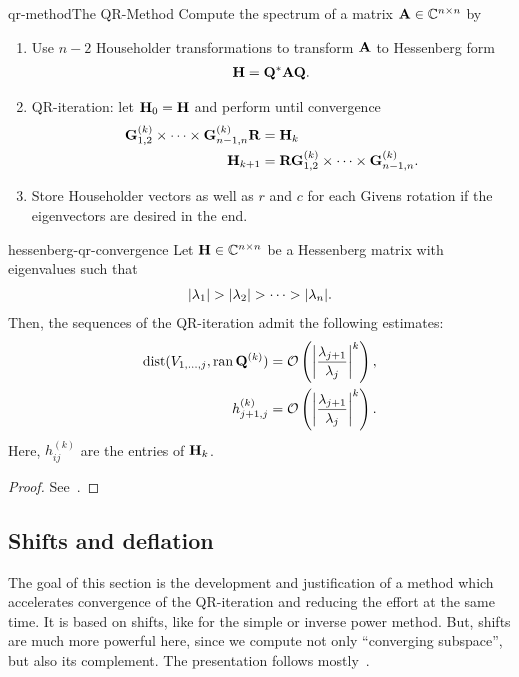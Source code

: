 \begin{Algorithm*}{qr-method}{The QR-Method}
  Compute the spectrum of a matrix $\mata\in\Cnn$ by
  \begin{enumerate}
  \item Use $n-2$ Householder transformations to transform $\mata$ to
    Hessenberg form
    \begin{gather}
     \matH = \matq^*\mata\matq.
   \end{gather}
 \item QR-iteration: let $\matH_{0}=\matH$ and perform until convergence
   \begin{align}
     \givens^{(k)}_{1,2}\times\dots\times\givens^{(k)}_{n-1,n} \matr &= \matH_k\\
     \matH_{k+1} &= \matr \givens^{(k)}_{1,2}\times\dots\times\givens^{(k)}_{n-1,n}.
   \end{align}
 \item Store Householder vectors as well as $r$ and $c$ for each
   Givens rotation if the eigenvectors are desired in the end.
  \end{enumerate}
\end{Algorithm*}

\begin{Theorem}{hessenberg-qr-convergence}
    Let $\matH\in\Cnn$ be a Hessenberg matrix with eigenvalues such that
  \begin{gather}
    \abs{\lambda_1} >
    \abs{\lambda_2}>\dots>\abs{\lambda_n}.
  \end{gather}
  Then, the sequences of the QR-iteration admit the following estimates:
  \begin{align}
    \dist(\esp{1,\dots,j},\ran{\matq^{(k)}}) &= \bigo \left(\abs*{\frac{\lambda_{j+1}}{\lambda_j}}^k\right),
    \\
    h_{j+1,j}^{(k)} &= \bigo \left(\abs*{\frac{\lambda_{j+1}}{\lambda_j}}^k\right)
                      .
  \end{align}
  Here, $h_{ij}^{(k)}$ are the entries of $\matH_k$.
\end{Theorem}

\begin{proof}
  See~\cite[Theorem 7.3-1]{GolubVanLoan83}.
\end{proof}

\subsection{Shifts and deflation}

\begin{intro}
  The goal of this section is the development and justification of a
  method which accelerates convergence of the QR-iteration and
  reducing the effort at the same time. It is based on shifts, like
  for the simple or inverse power method. But, shifts are much more
  powerful here, since we compute not only ``converging subspace'',
  but also its complement. The presentation follows
  mostly~\cite{GolubVanLoan83}.
\end{intro}

